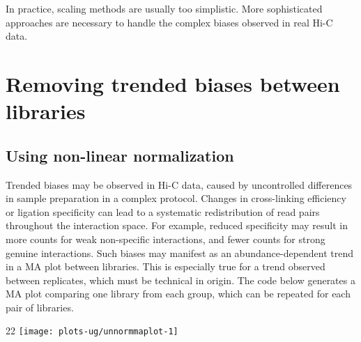 \documentclass{report}\usepackage[]{graphicx}\usepackage[usenames,dvipsnames]{color}
\makeatletter
\def\maxwidth{ %
  \ifdim\Gin@nat@width>\linewidth
    \linewidth
  \else
    \Gin@nat@width
  \fi
}
\newcommand{\hlnum}[1]{\textcolor[rgb]{0.816,0.125,0.439}{#1}}%
\newcommand{\hlstr}[1]{\textcolor[rgb]{0.251,0.627,0.251}{#1}}%
\newcommand{\hlopt}[1]{\textcolor[rgb]{0,0,0}{#1}}%
\newcommand{\hlstd}[1]{\textcolor[rgb]{0.251,0.251,0.251}{#1}}%
\newcommand{\hlkwb}[1]{\textcolor[rgb]{0,0,0}{#1}}%
\newcommand{\hlkwc}[1]{\textcolor[rgb]{0.251,0.251,0.251}{#1}}%
\newcommand{\hlkwd}[1]{\textcolor[rgb]{0.878,0.439,0.125}{#1}}%
\newenvironment{knitrout}{}{} %
\makeatother
\begin{document}
In practice, scaling methods are usually too simplistic.
More sophisticated approaches are necessary to handle the complex biases observed in real Hi-C data.

\section{Removing trended biases between libraries}

\subsection{Using non-linear normalization}
Trended biases may be observed in Hi-C data, caused by uncontrolled differences in sample preparation in a complex protocol.
Changes in cross-linking efficiency or ligation specificity can lead to a systematic redistribution of read pairs throughout the interaction space. 
For example, reduced specificity may result in more counts for weak non-specific interactions, and fewer counts for strong genuine interactions.
Such biases may manifest as an abundance-dependent trend in a MA plot between libraries.
This is especially true for a trend observed between replicates, which must be technical in origin.
The code below generates a MA plot comparing one library from each group, which can be repeated for each pair of libraries.





\begin{knitrout}
\color{fgcolor}\begin{adjustwidth}{2\fltoffset}{2\fltoffset}
\texttt{[image: plots-ug/unnormmaplot-1]} \end{adjustwidth}
\end{knitrout}
\end{document}
